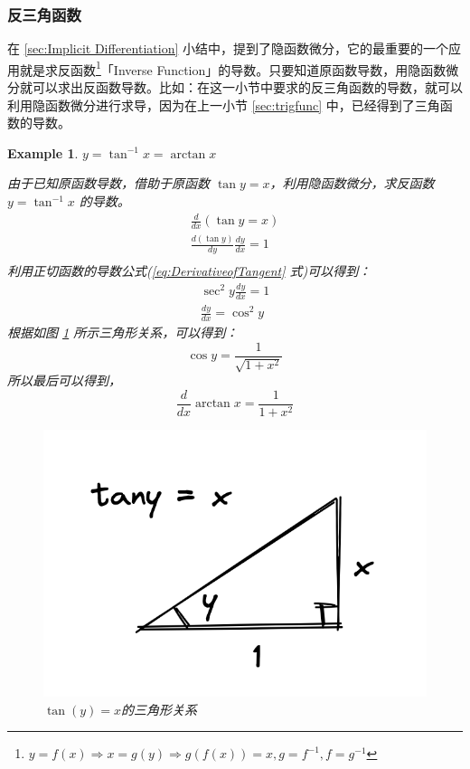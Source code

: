 \documentclass{ctexart}
\numberwithin{equation}{section}
\numberwithin{figure}{section}
\newtheorem{myEx}{Example}[section] %
\begin{document}
\subsubsection{反三角函数}

在 \ref{sec:Implicit Differentiation} 小结中，提到了隐函数微分，它的最重要的一个应用就是求反函数\footnote{\(y = f(x) \Rightarrow x = g(y) \Rightarrow g(f(x)) = x, g = f^{-1}, f = g^{-1}\)}「Inverse Function」的导数。只要知道原函数导数，用隐函数微分就可以求出反函数导数。比如：在这一小节中要求的反三角函数的导数，就可以利用隐函数微分进行求导，因为在上一小节 \ref{sec:trigfunc} 中，已经得到了三角函数的导数。

\begin{myEx}
    \(y = \tan^{-1}x = \arctan x\)

    由于已知原函数导数，借助于原函数 \(\tan y  = x\)，利用隐函数微分，求反函数 \(y = \tan^{-1}x\) 的导数。
    \begin{align*}
        \frac{d}{dx}\left(\tan y  = x\right)              \\
        \frac{d\left(\tan y\right)}{dy} \frac{dy}{dx} = 1 \\
    \end{align*}
    利用正切函数的导数公式(\ref{eq:DerivativeofTangent} 式)可以得到：
    \begin{align*}
        \sec^{2}y \frac{dy}{dx} = 1 \\
        \frac{dy}{dx} = \cos^{2}y
    \end{align*}
    根据如图 \ref{fig:Derivativeofarctanx} 所示三角形关系，可以得到：
    \begin{equation*}
        \cos y = \frac{1}{\sqrt{1 + x^{2}}}
    \end{equation*}
    所以最后可以得到，
    \begin{equation}
        \frac{d}{dx}\arctan x = \frac{1}{1 + x^{2}}
    \end{equation}
    \begin{figure}[H]
        \centering
        \includegraphics[scale=0.5]{images/Derivativeofarctanx.png}
        \caption{\(\tan(y) = x\)的三角形关系}
        \label{fig:Derivativeofarctanx}
    \end{figure}
\end{myEx}
\end{document}
